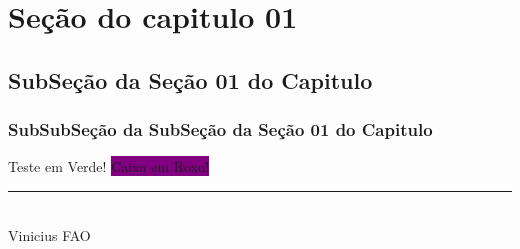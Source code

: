 \documentclass[12pt, a4paper, onside]{article}
\begin{document}
\section{Seção do capitulo 01}
\subsection{SubSeção da Seção 01 do Capitulo}
\subsubsection{SubSubSeção da SubSeção da Seção 01 do Capitulo}


\textcolor{Verde primavera}{Teste em Verde!}
{\color{Aqua}{Trecho em Azul!}}
\colorbox{Purple}{Caixa em Roxo!}

\newpage
\begin{center}
\noindent
\rule{10cm}{0.02cm}\\
Vinicius FAO
\end{center}
\end{document}
